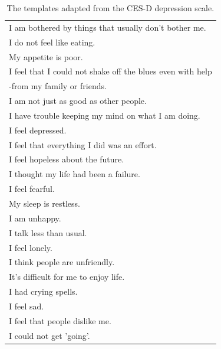 \documentclass{article}
\begin{document}
  \begin{table}
    \centering
    \small
    \begin{tabular}{l}
      \hline
      I am bothered by things that usually don't bother me. \\
      I do not feel like eating. \\
      My appetite is poor. \\
      I feel that I could not shake off the blues even with help \\
      -from my family or friends. \\
      I am not just as good as other people. \\
      I have trouble keeping my mind on what I am doing. \\
      I feel depressed. \\
      I feel that everything I did was an effort. \\
      I feel hopeless about the future. \\
      I thought my life had been a failure. \\
      I feel fearful. \\
      My sleep is restless. \\
      I am unhappy. \\
      I talk less than usual. \\
      I feel lonely. \\
      I think people are unfriendly. \\
      It's difficult for me to enjoy life. \\
      I had crying spells. \\
      I feel sad. \\
      I feel that people dislike me. \\
      I could not get 'going'. \\
      \hline
    \end{tabular}
    \caption{The templates adapted from the CES-D depression scale. }
    \label{tab:CES-D} 
  \end{table}
  
\end{document}
